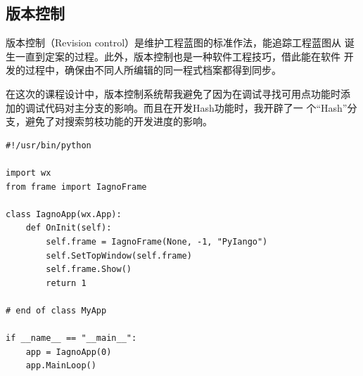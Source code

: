 \documentclass[oneside,a4paper]{article}
\begin{document}
\subsection{版本控制}
\label{sec:revision-control}

版本控制（Revision control）是维护工程蓝图的标准作法，能追踪工程蓝图从
诞生一直到定案的过程。此外，版本控制也是一种软件工程技巧，借此能在软件
开发的过程中，确保由不同人所编辑的同一程式档案都得到同步。

在这次的课程设计中，版本控制系统帮我避免了因为在调试寻找可用点功能时添
加的调试代码对主分支的影响。而且在开发Hash功能时，我开辟了一
个``Hash''分支，避免了对搜索剪枝功能的开发进度的影响。

\begin{lstlisting}[caption={pyiagno.py}]
#!/usr/bin/python

import wx
from frame import IagnoFrame

class IagnoApp(wx.App):
    def OnInit(self):
        self.frame = IagnoFrame(None, -1, "PyIango")
        self.SetTopWindow(self.frame)
        self.frame.Show()
        return 1

# end of class MyApp

if __name__ == "__main__":
    app = IagnoApp(0)
    app.MainLoop()
\end{lstlisting}
\end{document}
